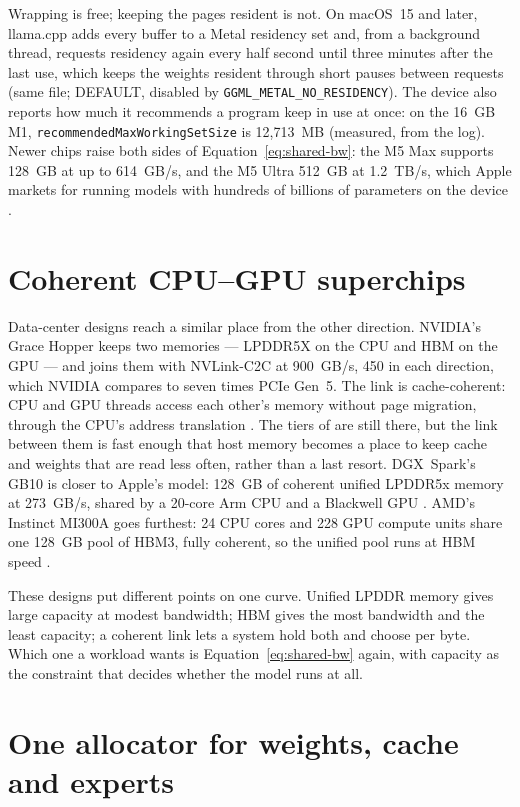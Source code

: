 Wrapping is free; keeping the pages resident is not. On macOS~15 and later,
llama.cpp adds every buffer to a Metal residency set and, from a background
thread, requests residency again every half second until three minutes after
the last use, which keeps the weights resident through short pauses between
requests (same file; DEFAULT, disabled by
\texttt{GGML\_METAL\_NO\_RESIDENCY}). The device also reports how much it
recommends a program keep in use at once: on the 16~GB M1,
\texttt{recommendedMaxWorkingSetSize} is 12,713~MB (measured, from the log).
Newer chips raise both sides of Equation~\ref{eq:shared-bw}: the M5 Max
supports 128~GB at up to 614~GB/s, and the M5 Ultra 512~GB at 1.2~TB/s, which
Apple markets for running models with hundreds of billions of parameters on
the device \cite{apple2026m5ultra}.

\section{Coherent CPU--GPU superchips}

Data-center designs reach a similar place from the other direction. NVIDIA's
Grace Hopper keeps two memories --- LPDDR5X on the CPU and HBM on the GPU ---
and joins them with NVLink-C2C at 900~GB/s, 450 in each direction, which NVIDIA
compares to seven times PCIe Gen~5. The link is cache-coherent: CPU and GPU
threads access each other's memory without page migration, through the CPU's
address translation \cite{nvidia2022gracehopper,nvidia2026gh200}. The tiers of
 are still there, but the link between them is fast enough
that host memory becomes a place to keep cache and weights that are read less
often, rather than a last resort. DGX~Spark's GB10 is closer to Apple's model:
128~GB of coherent unified LPDDR5x memory at 273~GB/s, shared by a 20-core Arm
CPU and a Blackwell GPU \cite{nvidia2026dgxspark}. AMD's Instinct MI300A goes
furthest: 24 CPU cores and 228 GPU compute units share one 128~GB pool of HBM3,
fully coherent, so the unified pool runs at HBM speed \cite{amd2026mi300a}.

These designs put different points on one curve. Unified LPDDR memory gives
large capacity at modest bandwidth; HBM gives the most bandwidth and the least
capacity; a coherent link lets a system hold both and choose per byte. Which one a workload wants is Equation~\ref{eq:shared-bw} again, with
capacity as the constraint that decides whether the model runs at all.

\section{One allocator for weights, cache and experts}

